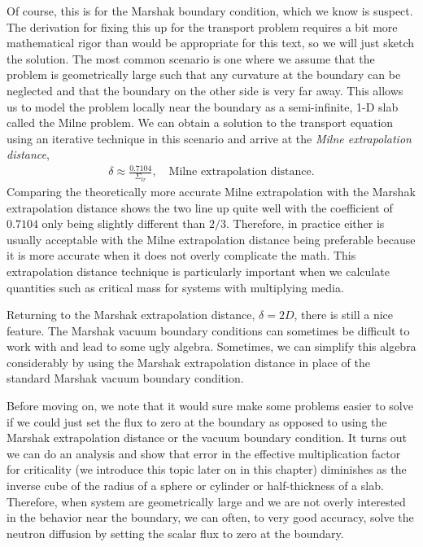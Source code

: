Of course, this is for the Marshak boundary condition, which we know is suspect. The derivation for fixing this up for the transport problem requires a bit more mathematical rigor than would be appropriate for this text, so we will just sketch the solution. The most common scenario is one where we assume that the problem is geometrically large such that any curvature at the boundary can be neglected and that the boundary on the other side is very far away. This allows us to model the problem locally near the boundary as a semi-infinite, 1-D slab called the Milne problem. We can obtain a solution to the transport equation using an iterative technique in this scenario and arrive at the \emph{Milne extrapolation distance},
\begin{align}
  \delta \approx \frac{ 0.7104 }{ \Sigma_{tr} },  \quad \text{Milne extrapolation distance.}
\end{align}
Comparing the theoretically more accurate Milne extrapolation with the Marshak extrapolation distance shows the two line up quite well with the coefficient of $0.7104$ only being slightly different than $2/3$. Therefore, in practice either is usually acceptable with the Milne extrapolation distance being preferable because it is more accurate when it does not overly complicate the math. This extrapolation distance technique is particularly important when we calculate quantities such as critical mass for systems with multiplying media.

Returning to the Marshak extrapolation distance, $\delta = 2D$, there is still a nice feature. The Marshak vacuum boundary conditions can sometimes be difficult to work with and lead to some ugly algebra. Sometimes, we can simplify this algebra considerably by using the Marshak extrapolation distance in place of the standard Marshak vacuum boundary condition. 

Before moving on, we note that it would sure make some problems easier to solve if we could just set the flux to zero at the boundary as opposed to using the Marshak extrapolation distance or the vacuum boundary condition. It turns out we can do an analysis and show that error in the effective multiplication factor for criticality (we introduce this topic later on in this chapter) diminishes as the inverse cube of the radius of a sphere or cylinder or half-thickness of a slab. Therefore, when system are geometrically large and we are not overly interested in the behavior near the boundary, we can often, to very good accuracy, solve the neutron diffusion by setting the scalar flux to zero at the boundary. 

